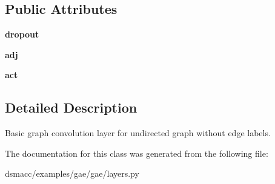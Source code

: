 \subsection*{Public Attributes}
\begin{DoxyCompactItemize}
\item 
\mbox{\label{classgae_1_1layers_1_1GraphConvolution_ac934c211de816c7e03c9140e9a30d4f0}} 
{\bfseries dropout}
\item 
\mbox{\label{classgae_1_1layers_1_1GraphConvolution_ad4181d9628bbd0f5697a332c8e3f366b}} 
{\bfseries adj}
\item 
\mbox{\label{classgae_1_1layers_1_1GraphConvolution_a5f59cb4c6569a8ba82902a56099e2d59}} 
{\bfseries act}
\end{DoxyCompactItemize}


\subsection{Detailed Description}
\begin{DoxyVerb}Basic graph convolution layer for undirected graph without edge labels.\end{DoxyVerb}
 

The documentation for this class was generated from the following file\+:\begin{DoxyCompactItemize}
\item 
dsmacc/examples/gae/gae/layers.\+py\end{DoxyCompactItemize}
